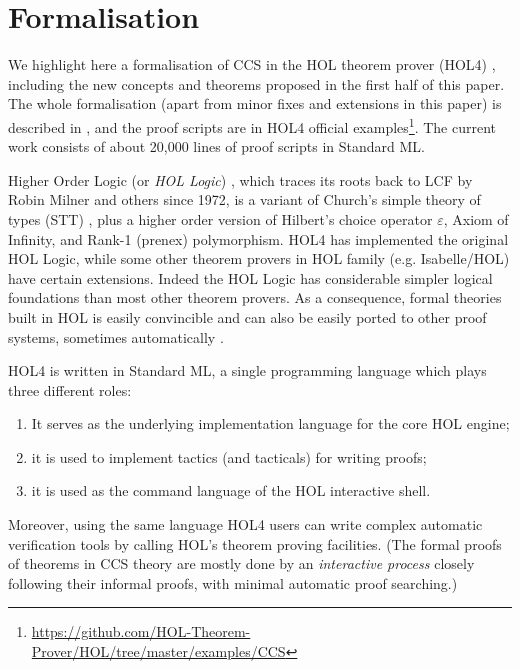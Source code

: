 \section{Formalisation}
\label{s:for}
We highlight here a formalisation of CCS
in the HOL theorem
prover (HOL4) \cite{slind2008brief},
including the new concepts and theorems proposed in the first half of
this paper.
The whole formalisation (apart from minor fixes and extensions in this
paper)
is described in \cite{Tian:2017wrba}, and the
proof scripts are in HOL4 official
examples\footnote{\url{https://github.com/HOL-Theorem-Prover/HOL/tree/master/examples/CCS}}. The
current work consists of about 20,000 lines of proof scripts in Standard ML.

Higher Order Logic (or \emph{HOL Logic}) \cite{hollogic}, which traces
its roots back to LCF
\cite{gordon1979edinburgh,milner1972logic} by Robin Milner and others since 1972, is a variant of
Church’s simple theory of types (STT) \cite{church1940formulation},
plus a higher order version of Hilbert's choice operator $\varepsilon$,
Axiom of Infinity, and Rank-1 (prenex) polymorphism.
HOL4 has implemented the original HOL Logic, 
while some other theorem provers in HOL family (e.g. Isabelle/HOL) have
certain extensions.
Indeed the HOL Logic has considerable simpler logical
foundations than most other theorem provers. %
As a consequence,
formal theories built in HOL is easily convincible and can
also be easily ported to other proof systems,
sometimes automatically \cite{hurd2011opentheory}.

HOL4 is written in Standard ML, a single programming language which
plays three different roles:
\begin{enumerate}
\item It serves as the underlying implementation language for the core HOL engine;\vspace{-1ex}
\item it is used to implement tactics (and tacticals) for writing proofs;\vspace{-1ex}
\item it is used as the command language of the HOL interactive shell.
\end{enumerate}
Moreover, using the same language HOL4 users can write complex automatic
verification tools by calling HOL's theorem proving
facilities. (The formal proofs of theorems in CCS theory
are mostly done by an \emph{interactive process} closely following
their informal proofs, with minimal automatic proof searching.)

